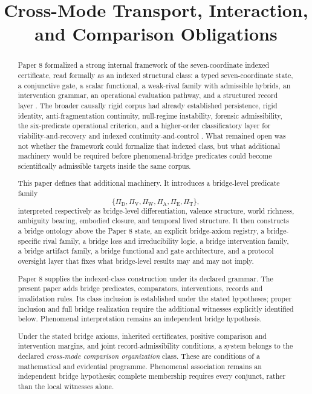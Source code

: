 \documentclass[11pt,a4paper]{article}
\title{\textbf{Cross-Mode Transport, Interaction, and Comparison Obligations}}
\author{\AuthorVisible}
\date{}
\theoremstyle{definition}
\newcommand{\PiD}{\Pi_{\mathrm{D}}}
\newcommand{\PiV}{\Pi_{\mathrm{V}}}
\newcommand{\PiW}{\Pi_{\mathrm{W}}}
\newcommand{\PiA}{\Pi_{\mathrm{A}}}
\newcommand{\PiE}{\Pi_{\mathrm{E}}}
\newcommand{\PiT}{\Pi_{\mathrm{T}}}
\begin{document}
\setlength{\emergencystretch}{3em}
\maketitle

\begin{abstract}
Paper 8 formalized a strong internal framework of the seven-coordinate indexed certificate, read formally as an indexed structural class: a typed seven-coordinate state, a conjunctive gate, a scalar functional, a weak-rival family with admissible hybrids, an intervention grammar, an operational evaluation pathway, and a structured record layer \cite{paper8}. The broader causally rigid corpus had already established persistence, rigid identity, anti-fragmentation continuity, null-regime instability, forensic admissibility, the six-predicate operational criterion, and a higher-order classificatory layer for viability-and-recovery and indexed continuity-and-control \cite{core,paper1,paper2,paper3,paper4,paper5,paper6,paper7}. What remained open was not whether the framework could formalize that indexed class, but what additional machinery would be required before phenomenal-bridge predicates could become scientifically admissible targets inside the same corpus.

This paper defines that additional machinery. It introduces a bridge-level predicate family
\[
\{\PiD,\allowbreak \PiV,\allowbreak \PiW,\allowbreak \PiA,\allowbreak \PiE,\allowbreak \PiT\},
\]
interpreted respectively as bridge-level differentiation, valence structure, world richness, ambiguity bearing, embodied closure, and temporal lived structure. It then constructs a bridge ontology above the Paper 8 state, an explicit bridge-axiom registry, a bridge-specific rival family, a bridge loss and irreducibility logic, a bridge intervention family, a bridge artifact family, a bridge functional and gate architecture, and a protocol oversight layer that fixes what bridge-level results may and may not imply.

Paper 8 supplies the indexed-class construction under its declared grammar. The present paper adds bridge predicates, comparators, interventions, records and invalidation rules. Its class inclusion is established under the stated hypotheses; proper inclusion and full bridge realization require the additional witnesses explicitly identified below. Phenomenal interpretation remains an independent bridge hypothesis.

Under the stated bridge axioms, inherited certificates, positive comparison and intervention margins, and joint record-admissibility conditions, a system belongs to the declared \emph{cross-mode comparison organization} class. These are conditions of a mathematical and evidential programme. Phenomenal association remains an independent bridge hypothesis; complete membership requires every conjunct, rather than the local witnesses alone.


\end{abstract}
\end{document}
